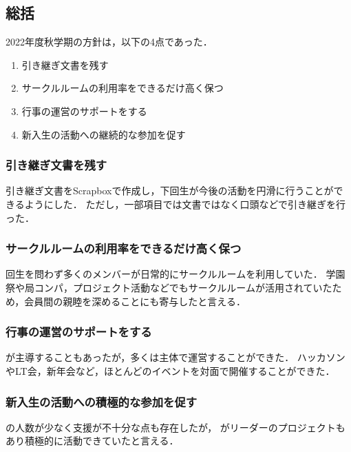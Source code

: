 \subsection*{\thirdGrade{}総括}


2022年度秋学期の\thirdGrade{}方針は，以下の4点であった．

\begin{enumerate}
    \item 引き継ぎ文書を残す
    \item サークルルームの利用率をできるだけ高く保つ
    \item 行事の運営のサポートをする
    \item 新入生の活動への継続的な参加を促す
\end{enumerate}


\subsubsection*{引き継ぎ文書を残す}
引き継ぎ文書をScrapboxで作成し，下回生が今後の活動を円滑に行うことができるようにした．
ただし，一部項目では文書ではなく口頭などで引き継ぎを行った．

\subsubsection*{サークルルームの利用率をできるだけ高く保つ}

回生を問わず多くのメンバーが日常的にサークルルームを利用していた．
学園祭や局コンパ，プロジェクト活動などでもサークルルームが活用されていたため，会員間の親睦を深めることにも寄与したと言える．

\subsubsection*{行事の運営のサポートをする}

\thirdGrade{}が主導することもあったが，多くは\secondGrade{}主体で運営することができた．
ハッカソンやLT会，新年会など，ほとんどのイベントを対面で開催することができた．

\subsubsection*{新入生の活動への積極的な参加を促す}

\secondGrade{}の人数が少なく支援が不十分な点も存在したが，
\firstGrade{}がリーダーのプロジェクトもあり積極的に活動できていたと言える．
